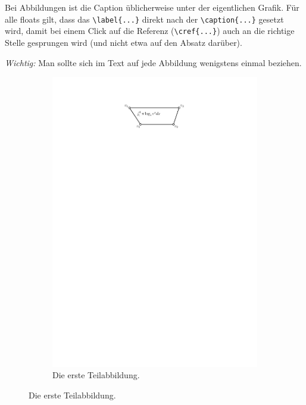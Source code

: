 \documentclass[bachelor,german]{algothesis}
\begin{document}
Bei Abbildungen ist die Caption üblicherweise unter der eigentlichen Grafik.
Für alle floats gilt, dass das \verb+\label{...}+ direkt nach der \verb+\caption{...}+ gesetzt wird, damit bei einem Click auf die Referenz (\verb+\cref{...}+) auch an die richtige Stelle gesprungen wird (und nicht etwa auf den Absatz darüber).

\emph{Wichtig:} Man sollte sich im Text auf jede Abbildung wenigstens einmal beziehen. 

\begin{figure}[bp]
  \begin{subfigure}{.48\textwidth}
    \centering
    \includegraphics[page=1]{trapez}
    \caption{Die erste Teilabbildung.}
    \label{fig:trapez-eins}
  \end{subfigure}
  \hfill %

\end{figure}
\end{document}
